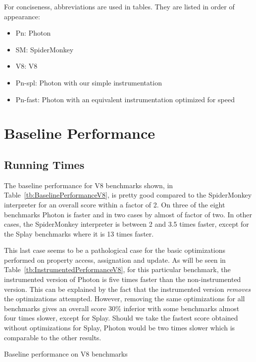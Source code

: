 For conciseness, abbreviations are used in tables. They are listed in order of 
appearance:
\begin{itemize}
    \item Pn: Photon
    \item SM: SpiderMonkey
    \item V8: V8
    \item Pn-spl: Photon with our simple instrumentation
    \item Pn-fast: Photon with an equivalent instrumentation optimized for speed
\end{itemize}

\section{Baseline Performance}

\subsection{Running Times}

The baseline performance for V8 benchmarks shown, in
Table~\ref{tb:BaselinePerformanceV8}, is pretty good compared to the
SpiderMonkey interpreter for an overall score within a factor of 2. On three of
the eight benchmarks Photon is faster and in two cases by almost of factor of
two. In other cases, the SpiderMonkey interpreter is between 2 and 3.5 times
faster, except for the Splay benchmarks where it is 13 times faster. 

This last case seems to be a pathological case for the basic optimizations
performed on property access, assignation and update. As will be seen in
Table~\ref{tb:InstrumentedPerformanceV8}, for this particular benchmark, the
instrumented version of Photon is five times faster than the non-instrumented
version. This can be explained by the fact that the instrumented version
\textit{removes} the optimizations attempted. However, removing the same
optimizations for all benchmarks gives an overall score 30\% inferior with some
benchmarks almost four times slower, except for Splay. Should we take the
fastest score obtained without optimizations for Splay, Photon would be two
times slower which is comparable to the other results.

\begin{table}[htb]
\caption{Baseline performance on V8 benchmarks}
\centering
    
\label{tb:BaselinePerformanceV8}
\end{table}

